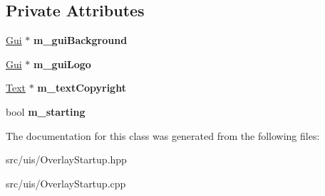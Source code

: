 \subsection*{Private Attributes}
\begin{DoxyCompactItemize}
\item 
\mbox{\label{class_flounder_1_1_overlay_startup_a48ad08e842cd55e46ff6d9464d2328f7}} 
\hyperlink{class_flounder_1_1_gui}{Gui} $\ast$ {\bfseries m\+\_\+gui\+Background}
\item 
\mbox{\label{class_flounder_1_1_overlay_startup_a6cddc6ec5f31dc691efa0123b7227350}} 
\hyperlink{class_flounder_1_1_gui}{Gui} $\ast$ {\bfseries m\+\_\+gui\+Logo}
\item 
\mbox{\label{class_flounder_1_1_overlay_startup_a9e6dd0dc30ac42483abddde1d2adb101}} 
\hyperlink{class_flounder_1_1_text}{Text} $\ast$ {\bfseries m\+\_\+text\+Copyright}
\item 
\mbox{\label{class_flounder_1_1_overlay_startup_a21507d931020149564b35d817d00e96a}} 
bool {\bfseries m\+\_\+starting}
\end{DoxyCompactItemize}


The documentation for this class was generated from the following files\+:\begin{DoxyCompactItemize}
\item 
src/uis/Overlay\+Startup.\+hpp\item 
src/uis/Overlay\+Startup.\+cpp\end{DoxyCompactItemize}

